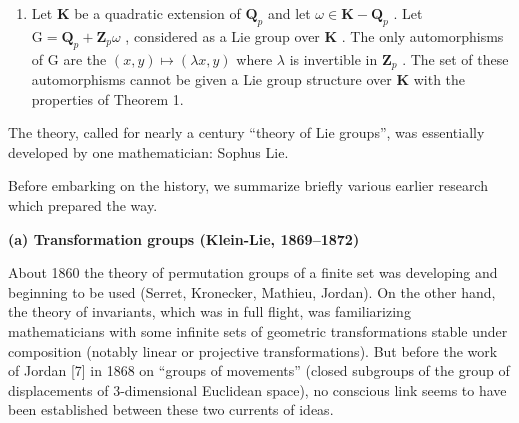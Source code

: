 \begin{enumerate}
\def\labelenumi{(\arabic{enumi})}
\setcounter{enumi}{3}
\tightlist
\item
  Let \(\mathbf{K}\) be a quadratic extension of \(\mathbf{Q}_p\) and let \(\omega \in \mathbf{K} - \mathbf{Q}_p\) . Let \(\mathrm{G} = \mathbf{Q}_p + \mathbf{Z}_p\omega\) , considered as a Lie group over \(\mathbf{K}\) . The only automorphisms of \(\mathrm{G}\) are the \((x,y)\mapsto (\lambda x,y)\) where \(\lambda\) is invertible in \(\mathbf{Z}_p\) . The set of these automorphisms cannot be given a Lie group structure over \(\mathbf{K}\) with the properties of Theorem 1.
\end{enumerate}



The theory, called for nearly a century ``theory of Lie groups'', was essentially developed by one mathematician: Sophus Lie.

Before embarking on the history, we summarize briefly various earlier research which prepared the way.

\textbf{(a) Transformation groups (Klein-Lie, 1869--1872)}

About 1860 the theory of permutation groups of a finite set was developing and beginning to be used (Serret, Kronecker, Mathieu, Jordan). On the other hand, the theory of invariants, which was in full flight, was familiarizing mathematicians with some infinite sets of geometric transformations stable under composition (notably linear or projective transformations). But before the work of Jordan {[}7{]} in 1868 on ``groups of movements'' (closed subgroups of the group of displacements of 3-dimensional Euclidean space), no conscious link seems to have been established between these two currents of ideas.

